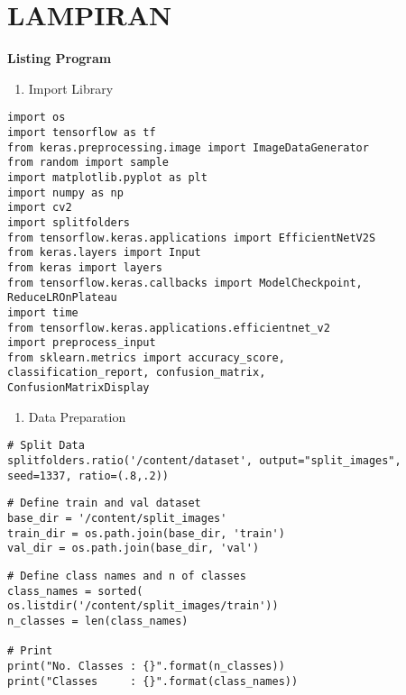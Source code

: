 \chapter*{LAMPIRAN}

\setcounter{page}{1}
\renewcommand{\thepage}{L-\arabic{page}}

\noindent
\textbf{Listing Program}
\begin{enumerate}[label=\alph*.]
    \item Import Library
\end{enumerate}

\begin{lstlisting}[style=customc]
import os
import tensorflow as tf
from keras.preprocessing.image import ImageDataGenerator
from random import sample
import matplotlib.pyplot as plt
import numpy as np
import cv2
import splitfolders
from tensorflow.keras.applications import EfficientNetV2S
from keras.layers import Input
from keras import layers
from tensorflow.keras.callbacks import ModelCheckpoint, 
ReduceLROnPlateau
import time
from tensorflow.keras.applications.efficientnet_v2 
import preprocess_input
from sklearn.metrics import accuracy_score, 
classification_report, confusion_matrix, 
ConfusionMatrixDisplay
\end{lstlisting}

\begin{enumerate}[label=\alph*., start=2]
    \item Data Preparation
\end{enumerate}

\begin{lstlisting}[style=customc]
# Split Data
splitfolders.ratio('/content/dataset', output="split_images", 
seed=1337, ratio=(.8,.2))
\end{lstlisting}

\begin{lstlisting}[style=customc]
# Define train and val dataset
base_dir = '/content/split_images'
train_dir = os.path.join(base_dir, 'train')
val_dir = os.path.join(base_dir, 'val')
\end{lstlisting}

\begin{lstlisting}[style=customc]
# Define class names and n of classes
class_names = sorted(
os.listdir('/content/split_images/train'))
n_classes = len(class_names)

# Print
print("No. Classes : {}".format(n_classes))
print("Classes     : {}".format(class_names))
\end{lstlisting}

